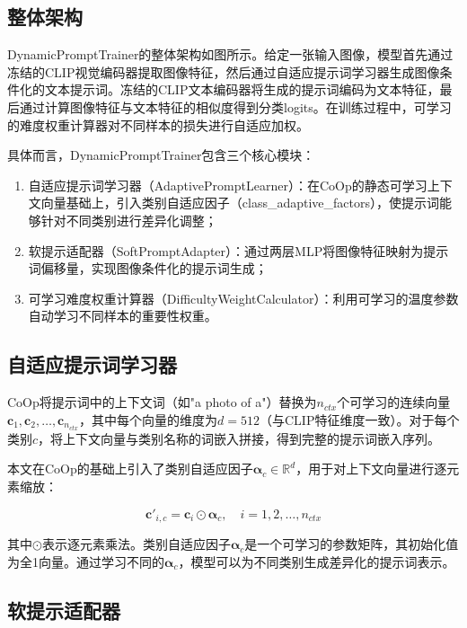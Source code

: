 \documentclass{HDU-Bachelor-Thesis}
\begin{document}
\subsection{整体架构}

DynamicPromptTrainer的整体架构如图所示。给定一张输入图像，模型首先通过冻结的CLIP视觉编码器提取图像特征，然后通过自适应提示词学习器生成图像条件化的文本提示词。冻结的CLIP文本编码器将生成的提示词编码为文本特征，最后通过计算图像特征与文本特征的相似度得到分类logits。在训练过程中，可学习的难度权重计算器对不同样本的损失进行自适应加权。

具体而言，DynamicPromptTrainer包含三个核心模块：

\begin{enumerate}
\item 自适应提示词学习器（AdaptivePromptLearner）：在CoOp的静态可学习上下文向量基础上，引入类别自适应因子（class\_adaptive\_factors），使提示词能够针对不同类别进行差异化调整；
\item 软提示适配器（SoftPromptAdapter）：通过两层MLP将图像特征映射为提示词偏移量，实现图像条件化的提示词生成；
\item 可学习难度权重计算器（DifficultyWeightCalculator）：利用可学习的温度参数自动学习不同样本的重要性权重。
\end{enumerate}

\subsection{自适应提示词学习器}

CoOp将提示词中的上下文词（如"a photo of a"）替换为$n_{ctx}$个可学习的连续向量$\mathbf{c}_1, \mathbf{c}_2, \ldots, \mathbf{c}_{n_{ctx}}$，其中每个向量的维度为$d=512$（与CLIP特征维度一致）。对于每个类别$c$，将上下文向量与类别名称的词嵌入拼接，得到完整的提示词嵌入序列。

本文在CoOp的基础上引入了类别自适应因子$\boldsymbol{\alpha}_c \in \mathbb{R}^{d}$，用于对上下文向量进行逐元素缩放：

\begin{equation}
\mathbf{c}'_{i,c} = \mathbf{c}_i \odot \boldsymbol{\alpha}_c, \quad i = 1, 2, \ldots, n_{ctx}
\end{equation}

其中$\odot$表示逐元素乘法。类别自适应因子$\boldsymbol{\alpha}_c$是一个可学习的参数矩阵，其初始化值为全1向量。通过学习不同的$\boldsymbol{\alpha}_c$，模型可以为不同类别生成差异化的提示词表示。

\subsection{软提示适配器}
\end{document}
